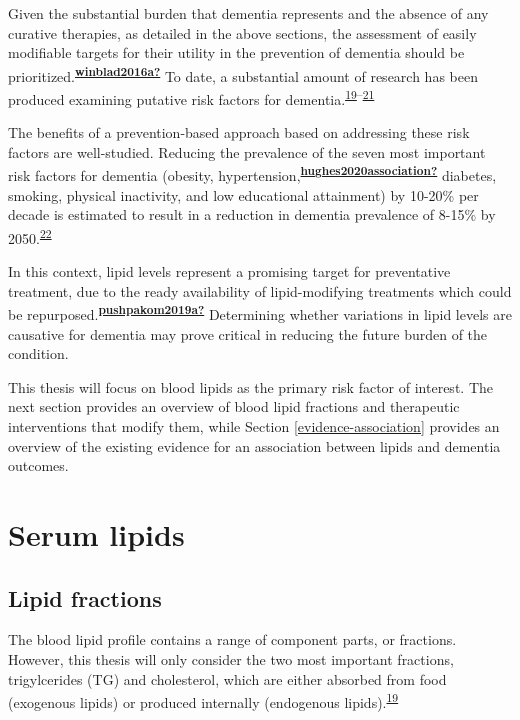 \documentclass[a4paper, twoside]{templates/ociamthesis}
\begin{document}
Given the substantial burden that dementia represents and the absence of any curative therapies, as detailed in the above sections, the assessment of easily modifiable targets for their utility in the prevention of dementia should be prioritized.\textsuperscript{\protect\hyperlink{ref-winblad2016a}{\textbf{winblad2016a?}}} To date, a substantial amount of research has been produced examining putative risk factors for dementia.\textsuperscript{\protect\hyperlink{ref-feingold2000}{19}--\protect\hyperlink{ref-anstey2019}{21}}

The benefits of a prevention-based approach based on addressing these risk factors are well-studied. Reducing the prevalence of the seven most important risk factors for dementia (obesity, hypertension,\textsuperscript{\protect\hyperlink{ref-hughes2020association}{\textbf{hughes2020association?}}} diabetes, smoking, physical inactivity, and low educational attainment) by 10-20\% per decade is estimated to result in a reduction in dementia prevalence of 8-15\% by 2050.\textsuperscript{\protect\hyperlink{ref-norton2014potential}{22}}

In this context, lipid levels represent a promising target for preventative treatment, due to the ready availability of lipid-modifying treatments which could be repurposed.\textsuperscript{\protect\hyperlink{ref-pushpakom2019a}{\textbf{pushpakom2019a?}}} Determining whether variations in lipid levels are causative for dementia may prove critical in reducing the future burden of the condition.

This thesis will focus on blood lipids as the primary risk factor of interest. The next section provides an overview of blood lipid fractions and therapeutic interventions that modify them, while Section \ref{evidence-association} provides an overview of the existing evidence for an association between lipids and dementia outcomes.

\hypertarget{serum-lipids}{%
\section{Serum lipids}\label{serum-lipids}}

\hypertarget{intro-lipid-fractions}{%
\subsection{Lipid fractions}\label{intro-lipid-fractions}}

The blood lipid profile contains a range of component parts, or fractions. However, this thesis will only consider the two most important fractions, trigylcerides (TG) and cholesterol, which are either absorbed from food (exogenous lipids) or produced internally (endogenous lipids).\textsuperscript{\protect\hyperlink{ref-feingold2000}{19}}
\end{document}
